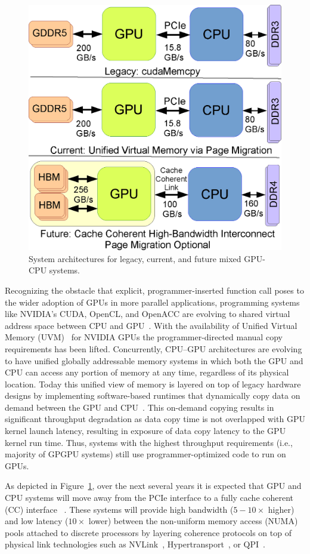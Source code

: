 \begin{figure}[t]
    \centering
    \includegraphics[width=0.4\columnwidth]{hpca2015/figures/architecture.eps}
    \caption{System architectures for legacy, current, and future mixed GPU-CPU systems.}
    \label{fig:arch-hpca2015}
\end{figure}

Recognizing the obstacle that explicit, programmer-inserted function call poses to the
wider adoption of GPUs in more parallel applications, programming systems like
NVIDIA's CUDA, OpenCL, and OpenACC are evolving to shared virtual address space
between CPU and GPU~\cite{UVM}. With the availability of Unified Virtual Memory
(UVM)~\cite{UVM} for NVIDIA GPUs the programmer-directed manual copy
requirements has been lifted.  Concurrently, CPU--GPU architectures are evolving
to have unified globally addressable memory systems in which both the GPU and
CPU can access any portion of memory at any time, regardless of its physical
location.  Today this unified view of memory is layered on top of legacy
hardware designs by implementing software-based runtimes that dynamically copy
data on demand between the GPU and CPU~\cite{cuda}. This on-demand copying results in significant
throughput degradation as data copy time is not overlapped with GPU kernel
launch latency, resulting in exposure of data copy latency to the GPU kernel run
time. Thus, systems with the highest throughput requirements (i.e., majority of
GPGPU systems) still use programmer-optimized code to run on GPUs.

As depicted in Figure~\ref{fig:arch-hpca2015}, over the next several years it is
expected that GPU and CPU systems will move away from the PCIe interface to a
fully cache coherent (CC) interface ~\cite{AMDHSA}. These systems will provide
high bandwidth ($5-10\times$ higher) and low latency ($10\times$ lower) between
the non-uniform memory access (NUMA) pools attached to discrete processors by
layering coherence protocols on top of physical link technologies such as
NVLink~\cite{NVLINK}, Hypertransport~\cite{AMDHT}, or QPI~\cite{INTELQPI}.


